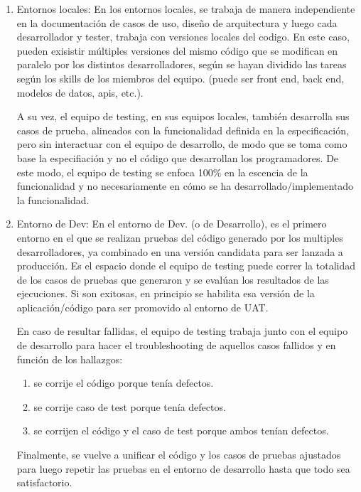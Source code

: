 \begin{enumerate}
    \item Entornos locales: En los entornos locales, se trabaja de manera independiente en la documentación de casos de uso, diseño de arquitectura y luego cada desarrollador y tester, trabaja con versiones locales del codigo. En este caso, pueden exisistir múltiples versiones del mismo código que se modifican en paralelo por los distintos desarrolladores, según se hayan dividido las tareas según los skills de los miembros del equipo. (puede ser front end, back end, modelos de datos, apis, etc.).

        A su vez, el equipo de testing, en sus equipos locales, también desarrolla sus casos de prueba, alineados con la funcionalidad definida en la especificación, pero sin interactuar con el equipo de desarrollo, de modo que se toma como base la especifiación y no el código que desarrollan los programadores. De este modo, el equipo de testing se enfoca 100\% en la escencia de la funcionalidad y no necesariamente en cómo se ha desarrollado/implementado la funcionalidad.
    
    
    \item Entorno de Dev: En el entorno de Dev. (o de Desarrollo), es el primero entorno en el que se realizan pruebas del código generado por los multiples desarrolladores, ya combinado en una versión candidata para ser lanzada a producción. Es el espacio donde el equipo de testing puede correr la totalidad de los casos de pruebas que generaron y se evalúan los resultados de las ejecuciones. Si son exitosas, en principio se habilita esa versión de la aplicación/código para ser promovido al entorno de UAT.
    
    En caso de resultar fallidas, el equipo de testing trabaja junto con el equipo de desarrollo para hacer el troubleshooting de aquellos casos fallidos y en función de los hallazgos:
        \begin{enumerate}
            \item se corrije el código porque tenía defectos.
            \item se corrije caso de test porque tenía defectos.
            \item se corrijen el código y el caso de test porque ambos tenían defectos.
        \end{enumerate}
    
    Finalmente, se vuelve a unificar el código y los casos de pruebas ajustados para luego repetir las pruebas en el entorno de desarrollo hasta que todo sea satisfactorio.


\end{enumerate}
